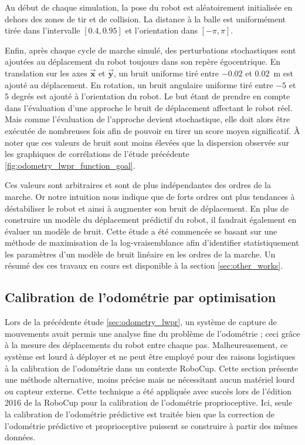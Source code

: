 Au début de chaque simulation, la pose du robot 
est aléatoirement initialisée en dehors des 
zones de tir et de collision.
La distance à la balle est uniformément tirée dans
l'intervalle $[0.4,0.95]$ et l'orientation dans $[-\pi,\pi]$.

Enfin, après chaque cycle de marche simulé, des perturbations 
stochastiques sont ajoutées au déplacement du robot toujours
dans son repère égocentrique.
En translation sur les axes $\vec{\bm{x}}$ et $\vec{\bm{y}}$,
un bruit uniforme tiré entre $-0.02$ et $0.02$~m est ajouté au déplacement.
En rotation, un bruit angulaire uniforme tiré entre $-5$ et $5$ degrés 
est ajouté à l'orientation du robot.
Le but étant de prendre en compte dans l'évaluation d'une approche
le bruit de déplacement affectant le robot réel.
Mais comme l'évaluation de l'approche devient stochastique,
elle doit alors être exécutée de nombreuses fois afin de pouvoir 
en tirer un score moyen significatif.
À noter que ces valeurs de bruit sont moins élevées que
la dispersion observée sur les graphiques de corrélations
de l'étude précédente \ref{fig:odometry_lwpr_function_goal}.

Ces valeurs sont arbitraires et sont de plus indépendantes 
des ordres de la marche.
Or notre intuition nous indique que de forts ordres ont plus tendances
à déstabiliser le robot et ainsi à augmenter son bruit de déplacement.
En plus de construire un modèle du déplacement prédictif du robot, il faudrait
également en évaluer un modèle de bruit.
Cette étude a été commencée se basant sur une méthode de maximisation
de la log-vraisemblance afin d'identifier statistiquement les paramètres 
d'un modèle de bruit linéaire en les ordres de la marche.
Un résumé des ces travaux en cours est disponible à la section \ref{sec:other_works}.

\subsection{Calibration de l'odométrie par optimisation}

Lors de la précédente étude \ref{sec:odometry_lwpr}, un système de capture de mouvements 
avait permis une analyse fine du problème de l'odométrie ; 
ceci grâce à la mesure des déplacements du robot entre chaque pas.
Malheureusement, ce système est lourd à déployer et ne peut être employé 
pour des raisons logistiques à la calibration de l'odométrie dans un contexte RoboCup.
Cette section présente une méthode alternative, moins précise mais ne nécessitant
aucun matériel lourd ou capteur externe.
Cette technique a été appliquée avec succès lors de l'édition 2016 de la RoboCup
pour la calibration de l'odométrie proprioceptive.
Ici, seule la calibration de l'odométrie prédictive est traitée bien que
la correction de l'odométrie prédictive et proprioceptive puissent se construire 
à partir des mêmes données.

